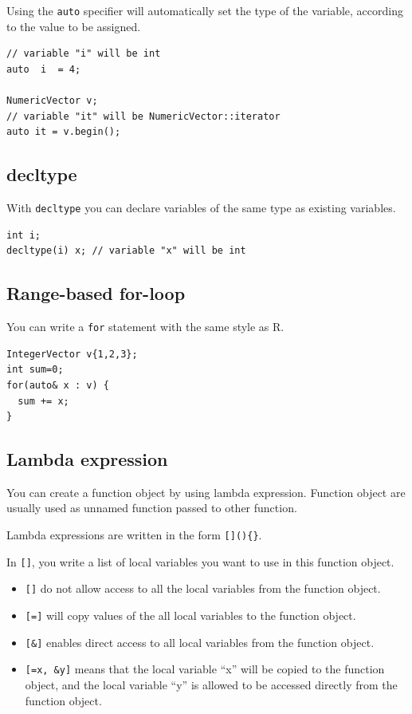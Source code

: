 \documentclass[]{book}
\providecommand{\tightlist}{%
  \setlength{\itemsep}{0pt}\setlength{\parskip}{0pt}}
\begin{document}
Using the \texttt{auto} specifier will automatically set the type of the variable, according to the value to be assigned.

\begin{verbatim}
// variable "i" will be int
auto  i  = 4;

NumericVector v;
// variable "it" will be NumericVector::iterator
auto it = v.begin();
\end{verbatim}

\hypertarget{decltype}{%
\subsection{decltype}\label{decltype}}

With \texttt{decltype} you can declare variables of the same type as existing variables.

\begin{verbatim}
int i;
decltype(i) x; // variable "x" will be int
\end{verbatim}

\hypertarget{range-based-for-loop}{%
\subsection{Range-based for-loop}\label{range-based-for-loop}}

You can write a \texttt{for} statement with the same style as R.

\begin{verbatim}
IntegerVector v{1,2,3};
int sum=0;
for(auto& x : v) {
  sum += x;
}
\end{verbatim}

\hypertarget{lambda-expression}{%
\subsection{Lambda expression}\label{lambda-expression}}

You can create a function object by using lambda expression. Function object are usually used as unnamed function passed to other function.

Lambda expressions are written in the form \texttt{{[}{]}()\{\}}.

In \texttt{{[}{]}}, you write a list of local variables you want to use in this function object.

\begin{itemize}
\tightlist
\item
  \texttt{{[}{]}} do not allow access to all the local variables from the function object.
\item
  \texttt{{[}={]}} will copy values of the all local variables to the function object.
\item
  \texttt{{[}\&{]}} enables direct access to all local variables from the function object.
\item
  \texttt{{[}=x,\ \&y{]}} means that the local variable ``x'' will be copied to the function object, and the local variable ``y'' is allowed to be accessed directly from the function object.
\end{itemize}
\end{document}
